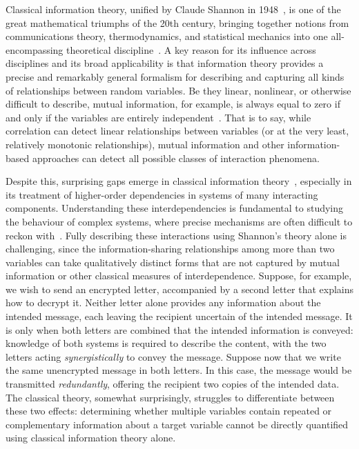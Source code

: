 \documentclass{article}
\begin{document}
Classical information theory, unified by Claude Shannon in 1948~\cite{shannon1948mathematical}, is one of the great mathematical triumphs of the 20th century, bringing together notions from communications theory, thermodynamics, and statistical mechanics into one all-encompassing theoretical discipline~\cite{nyquist1924certain, hartley1928transmission, clausius1865ueber, boltzmann1872weitere, boltzmann1970weitere, jaynes1957information}. A key reason for its influence across disciplines and its broad applicability is that information theory provides a precise and remarkably general formalism for describing and capturing all kinds of relationships between random variables. 
Be they linear, nonlinear, or otherwise difficult to describe, mutual information, for example, is always equal to zero if and only if the variables are entirely independent~\cite{cover1999elements}. 
That is to say, while correlation can detect linear relationships between variables (or at the very least, relatively monotonic relationships), mutual information and other information-based approaches can detect all possible classes of interaction phenomena.

Despite this, surprising gaps emerge in classical information theory~\cite{james2017multivariate, williams2010nonnegative}, especially in its treatment of higher-order dependencies in systems of many interacting components. Understanding these interdependencies is fundamental to studying the behaviour of complex systems, where precise mechanisms are often difficult to reckon with~\cite{rosas2022disentangling, luppi2020synergisticCore, down2026synergistic, neri2025taxonomy, combrisson2025higher, battiston2020networks, robiglio2025synergistic}. 
Fully describing these interactions using Shannon's theory alone is challenging, since the information-sharing relationships among more than two variables can take qualitatively distinct forms that are not captured by mutual information or other classical measures of interdependence.
Suppose, for example, we wish to send an encrypted letter, accompanied by a second letter that explains how to decrypt it. Neither letter alone provides any information about the intended message, each leaving the recipient uncertain of the intended message. It is only when both letters are combined that the intended information is conveyed: knowledge of both systems is required to describe the content, with the two letters acting \textit{synergistically} to convey the message. Suppose now that we write the same unencrypted message in both letters. In this case, the message would be transmitted \textit{redundantly}, offering the recipient two copies of the intended data. The classical theory, somewhat surprisingly, struggles to differentiate between these two effects: determining whether multiple variables contain repeated or complementary information about a target variable cannot be directly quantified using classical information theory alone.
\end{document}
